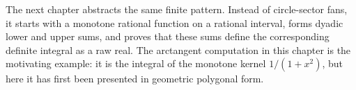 The next chapter abstracts the same finite pattern.  Instead of circle-sector
fans, it starts with a monotone rational function on a rational interval,
forms dyadic lower and upper sums, and proves that these sums define the
corresponding definite integral as a raw real.  The arctangent computation in
this chapter is the motivating example: it is the integral of the monotone
kernel \(1/(1+x^2)\), but here it has first been presented in geometric
polygonal form.
